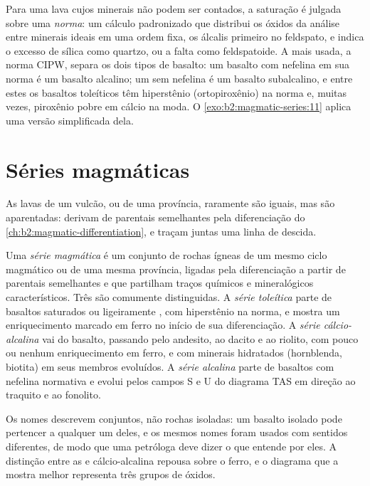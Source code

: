 Para uma lava cujos minerais não podem ser contados, a saturação é julgada sobre uma \emph{norma}: um
cálculo padronizado que distribui os óxidos da análise entre minerais ideais
em uma ordem fixa, os álcalis primeiro no feldspato, e indica o excesso de sílica como
quartzo, ou a falta como feldspatoide. A mais usada, a norma CIPW, separa os
dois tipos de basalto: um basalto com nefelina em sua norma é um basalto alcalino; um
sem nefelina é um basalto subalcalino, e entre estes os basaltos toleíticos têm
hiperstênio (ortopiroxênio) na norma e, muitas vezes, piroxênio pobre em cálcio na moda.
O \cref{exo:b2:magmatic-series:11} aplica uma versão simplificada dela.

\section{Séries magmáticas}\label{sec:b2:magmatic-series:series}

As lavas de um vulcão, ou de uma província, raramente são iguais, mas são aparentadas:
derivam de  parentais semelhantes pela diferenciação do
\cref{ch:b2:magmatic-differentiation}, e traçam juntas uma linha de descida.

\begin{definition}\label{def:b2:magmatic-series:series}
Uma \emph{série magmática} é um conjunto de rochas ígneas de um mesmo
ciclo magmático ou de uma mesma província, ligadas pela diferenciação a partir de  parentais semelhantes e
que partilham traços químicos e mineralógicos característicos. Três são comumente
distinguidas. A \emph{série toleítica} parte de
basaltos saturados ou ligeiramente , com hiperstênio na norma,
e mostra um enriquecimento marcado em ferro no início de sua diferenciação. A
\emph{série cálcio-alcalina} vai do basalto, passando pelo
andesito, ao dacito e ao riolito, com pouco ou nenhum enriquecimento em ferro, e com
minerais hidratados (hornblenda, biotita) em seus membros evoluídos. A \emph{série
alcalina} parte de basaltos com nefelina normativa e evolui
pelos campos S e U do diagrama TAS em direção ao traquito e ao fonolito.
\end{definition}

Os nomes descrevem conjuntos, não rochas isoladas: um basalto isolado pode pertencer a qualquer
um deles, e os mesmos nomes foram usados com sentidos diferentes, de modo que uma petróloga
deve dizer o que entende por eles. A distinção entre as  e
cálcio-alcalina repousa sobre o ferro, e o diagrama que a mostra melhor representa três
grupos de óxidos.

